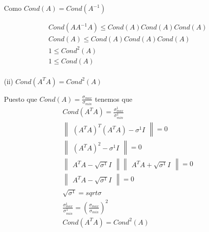 \begin{enumerate}[label=(\alph*)]
Como $Cond(A) = Cond(A^{-1})$

\begin{gather*}
Cond(AA^{-1}A) \leq Cond(A)Cond(A)Cond(A)\\
Cond(A) \leq Cond(A)Cond(A)Cond(A)\\
1 \leq Cond^2(A)\\
1 \leq Cond(A)\\
\end{gather*}

(ii) $Cond(A^TA)=Cond^2(A)$

Puesto que $Cond(A)= \frac{\sigma_{max}}{\sigma_{min}}$ tenemos que
\begin{gather*}
Cond(A^TA)=\frac{\sigma_{max}^1}{\sigma_{min}^1}\\
\begin{Vmatrix} (A^TA)^T(A^TA) - \sigma^1I \end{Vmatrix}=0\\
\begin{Vmatrix} (A^TA)^2 - \sigma^1I \end{Vmatrix}=0\\
\begin{Vmatrix} A^TA - \sqrt{\sigma^1}I \end{Vmatrix} \begin{Vmatrix} A^TA + \sqrt{\sigma^1}I \end{Vmatrix}=0\\
\begin{Vmatrix} A^TA - \sqrt{\sigma^1}I \end{Vmatrix} = 0\\
\sqrt{\sigma^1}=sqrt{\sigma}\\
\frac{\sigma_{max}^1}{\sigma_{min}^1}=\left( \frac{\sigma_{max}}{\sigma_{min}} \right) ^2\\
Cond(A^TA)=Cond^2(A)\\
\end{gather*}

\end{enumerate}